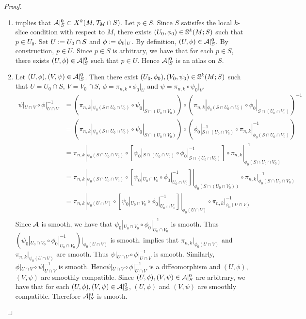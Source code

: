 \documentclass{book}
\begin{document}
	\begin{proof}\
		\begin{enumerate}
			\item {} implies that $\MA|_S^0 \subset X^k(M, \MT_M \cap S)$. Let $p \in S$. Since $S$ satisifes the local $k$-slice condition with respect to $M$, there exists $(U_0, \phi_0) \in \S^k(M; S)$ such that $p \in U_0$. Set $U \defeq U_0 \cap S$ and $\phi \defeq \phi_0|_{U}$. By definition, $(U, \phi) \in \MA|_S^0$. By construction, $p \in U$. Since $p \in S$ is arbitrary, we have that for each $p \in S$, there exists $(U, \phi) \in \MA|_S^0$ such that $p \in U$. Hence $\MA|_S^0$ is an atlas on $S$.
			\item Let $(U, \phi), (V, \psi) \in \MA|_S^0$. Then there exist $(U_0, \phi_0), (V_0, \psi_0) \in \S^k(M; S)$ such that $U = U_0 \cap S$, $V = V_0 \cap S$, $\phi = \pi_{n,k} \circ \phi_0|_U$ and $\psi = \pi_{n,k} \circ \psi_0|_V$. 
			\begin{align*}
				\psi|_{U \cap V} \circ \phi|_{U \cap V}^{-1}
				& = (\pi_{n,k}|_{\psi_0(S \cap U_0 \cap V_0)} \circ \psi_0|_{S \cap (U_0 \cap V_0)}) \circ (\pi_{n,k}|_{\phi_0(S \cap U_0 \cap V_0)} \circ \phi_0|_{S \cap (U_0 \cap V_0)})^{-1} \\
				& = (\pi_{n,k}|_{\psi_0(S \cap U_0 \cap V_0)} \circ \psi_0|_{S \cap (U_0 \cap V_0)}) \circ (\phi_0|_{S \cap (U_0 \cap V_0)}^{-1} \circ \pi_{n,k}|_{\phi_0(S \cap U_0 \cap V_0)}^{-1}) \\
				& = \pi_{n,k}|_{\psi_0(S \cap U_0 \cap V_0)} \circ [\psi_0|_{S \cap (U_0 \cap V_0)} \circ \phi_0|_{S \cap (U_0 \cap V_0)}^{-1}] \circ \pi_{n,k}|_{\phi_0(S \cap U_0 \cap V_0)}^{-1} \\
				& = \pi_{n,k}|_{\psi_0(S \cap U_0 \cap V_0)} \circ [\psi_0|_{U_0 \cap V_0} \circ \phi_0|_{U_0 \cap V_0}^{-1}]|_{\phi_0(S \cap (U_0 \cap V_0))} \circ \pi_{n,k}|_{\phi_0(S \cap U_0 \cap V_0)}^{-1} \\
				& = \pi_{n,k}|_{\psi_0(U \cap V)} \circ [\psi_0|_{U_0 \cap V_0} \circ \phi_0|_{U_0 \cap V_0}^{-1}]|_{\phi_0(U \cap V)} \circ \pi_{n,k}|_{\phi_0(U \cap V)}^{-1} \\
			\end{align*}
			Since $\MA$ is smooth, we have that $\psi_0|_{U_0 \cap V_0} \circ \phi_0|_{U_0 \cap V_0}^{-1}$ is smooth. Thus $(\psi_0|_{U_0 \cap V_0} \circ \phi_0|_{U_0 \cap V_0}^{-1})|_{\phi_0(U \cap V)}$ is smooth.  implies that $\pi_{n,k}|_{\phi_0(U \cap V)}$ and $\pi_{n,k}|_{\psi_0(U \cap V)}$ are smooth. Thus $\psi|_{U \cap V} \circ \phi|_{U \cap V}^{-1}$ is smooth. Similarly, $\phi|_{U \cap V} \circ \psi|_{U \cap V}^{-1}$ is smooth. Henc$\psi|_{U \cap V} \circ \phi|_{U \cap V}^{-1}$ is a diffeomorphism and $(U, \phi)$, $(V, \psi)$ are smoothly compatible. Since $(U, \phi), (V, \psi) \in \MA|_S^0$ are arbitrary, we have that for each $(U, \phi), (V, \psi) \in \MA|_S^0$, $(U, \phi)$ and $(V, \psi)$ are smoothly compatible. Therefore $\MA|_S^0$ is smooth.
		\end{enumerate}
	\end{proof}
\end{document}
